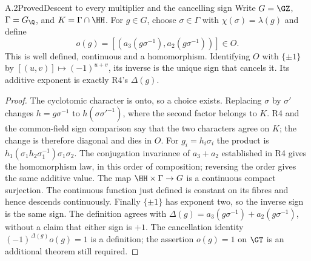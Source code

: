 \begin{statement}{A.2}{Proved}{Descent to every multiplier and the cancelling sign}
Write $G=\GZ$, $\Gamma=G_{\Q}$, and $K=\Gamma\cap\HH$.
For $g\in G$, choose $\sigma\in\Gamma$ with
$\chi(\sigma)=\lambda(g)$ and define
\[
 o(g)=[(a_3(g\sigma^{-1}),a_2(g\sigma^{-1}))]\in O.
\]
This is well defined, continuous and a homomorphism. Identifying $O$
with $\{\pm1\}$ by $[(u,v)]\mapsto(-1)^{u+v}$, its inverse is the
unique sign that cancels it. Its additive exponent is exactly R4's
$\Delta(g)$.
\end{statement}
\begin{proof}
The cyclotomic character is onto, so a choice exists. Replacing
$\sigma$ by $\sigma'$ changes $h=g\sigma^{-1}$ to
$h(\sigma\sigma'^{-1})$, where the second factor belongs to $K$.
R4 and the common-field sign comparison say that the two characters
agree on $K$; the change is therefore diagonal and dies in $O$.
For $g_i=h_i\sigma_i$ the product is
$h_1(\sigma_1h_2\sigma_1^{-1})\sigma_1\sigma_2$.
The conjugation invariance of $a_3+a_2$ established in R4 gives the
homomorphism law, in this order of composition; reversing the order
gives the same additive value. The map $\HH\times\Gamma\to G$ is a
continuous compact surjection. The continuous function just defined
is constant on its fibres and hence descends continuously.
Finally $\{\pm1\}$ has exponent two, so the inverse sign is the same
sign. The definition agrees with
$\Delta(g)=a_3(g\sigma^{-1})+a_2(g\sigma^{-1})$, without a claim
that either sign is $+1$. The cancellation identity
$(-1)^{\Delta(g)}o(g)=1$ is a definition; the assertion $o(g)=1$
on $\GT$ is an additional theorem still required.
\end{proof}

